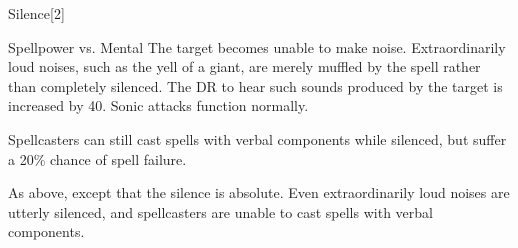 \begin{spellsection}{Silence}[2]
    \begin{spellheader}
    \end{spellheader}
    \begin{spellcontent}
        \begin{spelltargetinginfo}
        \end{spelltargetinginfo}
        \begin{spelleffects}
            \begin{spellattack}{Spellpower vs. Mental}
                \spellsuccess The target becomes unable to make noise.  Extraordinarily loud noises, such as the yell of a giant, are merely muffled by the spell rather than completely silenced. The DR to hear such sounds produced by the target is increased by 40. Sonic attacks function normally.

                Spellcasters can still cast spells with verbal components while silenced, but suffer a 20\% chance of spell failure.

                \spellcritical As above, except that the silence is absolute. Even extraordinarily loud noises are utterly silenced, and spellcasters are unable to cast spells with verbal components.
            \end{spellattack}
            \spelldur \durshort \dismissable
        \end{spelleffects}
    \end{spellcontent}
    \begin{spellfooter}
        \miscastrandom
    \end{spellfooter}
    \begin{spellaugments}
    \end{spellaugments}
\end{spellsection}

